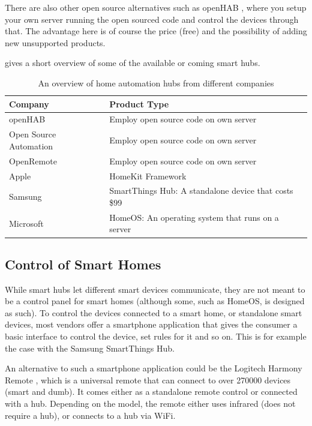 There are also other open source alternatives such as openHAB \cite{OPENHAB}, 
where you setup your own server running the open sourced code and control the devices through that. 
The advantage here is of course the price (free) and the possibility of adding new unsupported products. 

 gives a short overview of some of the available or coming smart hubs. 
\begin{table}
    \centering
    \begin{tabular}{l l}
        Company                           & Product Type \\ \hline
        openHAB \cite{OPENHAB}            & Employ open source code on own server \\
        Open Source Automation \cite{OSA} & Employ open source code on own server \\
        OpenRemote \cite{OPENREMOTE}      & Employ open source code on own server \\
        Apple \cite{HOMEKIT}              & HomeKit Framework \\
        Samsung \cite{SMARTTHINGS}        & SmartThings Hub: A standalone device that costs \$99 \\
        Microsoft \cite{HOMEOS}           & HomeOS: An operating system that runs on a server
    \end{tabular}
    \caption{An overview of home automation hubs from different companies}
    \label{table:smarthubs}
\end{table}

\subsection{Control of Smart Homes}\label{sec:smarthomecontrol}
While smart hubs let different smart devices communicate, 
they are not meant to be a control panel for smart homes (although some, such as HomeOS, is designed as such).
To control the devices connected to a smart home, or standalone smart devices, 
most vendors offer a smartphone application that gives the consumer a basic interface to control the device, 
set rules for it and so on.
This is for example the case with the Samsung SmartThings Hub. 

An alternative to such a smartphone application could be the Logitech Harmony Remote \cite{HARMONYREMOTE}, 
which is a universal remote that can connect to over \num{270000} devices (smart and dumb). 
It comes either as a standalone remote control or connected with a hub. 
Depending on the model, the remote either uses infrared (does not require a hub), 
or connects to a hub via WiFi. 


